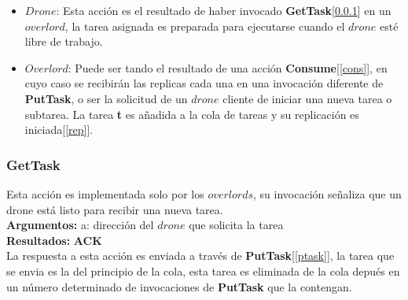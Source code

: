 \documentclass[a4paper,10pt]{article}
\begin{document}
			\begin{itemize}
				\item $Drone$: \linebreak
					Esta acción es el resultado de haber invocado \textbf{GetTask}[\ref{gtask}] en un $overlord$, la tarea asignada es preparada para ejecutarse cuando el $drone$ esté libre de trabajo.
				\item 	$Overlord$: \linebreak
					Puede ser tando el resultado de una acción \textbf{Consume}[\ref{cons}], en cuyo caso se recibirán las replicas cada una en una invocación diferente de \textbf{PutTask}, o ser la solicitud de un $drone$ cliente de iniciar una nueva tarea o subtarea. La tarea \textbf{t} es añadida a la cola de tareas y su replicación es iniciada[\ref{rep}].
			\end{itemize}	
			
		\subsubsection{GetTask}\label{gtask}
			Esta acción es implementada solo por los $overlords$, su invocación señaliza que un drone está listo para recibir una nueva tarea.
			\\
			\textbf{Argumentos:} a: dirección del $drone$ que solicita la tarea\\
			\textbf{Resultados:} \textbf{ACK}\\
			
			La respuesta a esta acción es enviada a través de \textbf{PutTask}[\ref{ptask}], la tarea que se envia es la del principio de la cola, esta tarea es eliminada de la cola depués en un número determinado de invocaciones de \textbf{PutTask} que la contengan.
		
\end{document}
